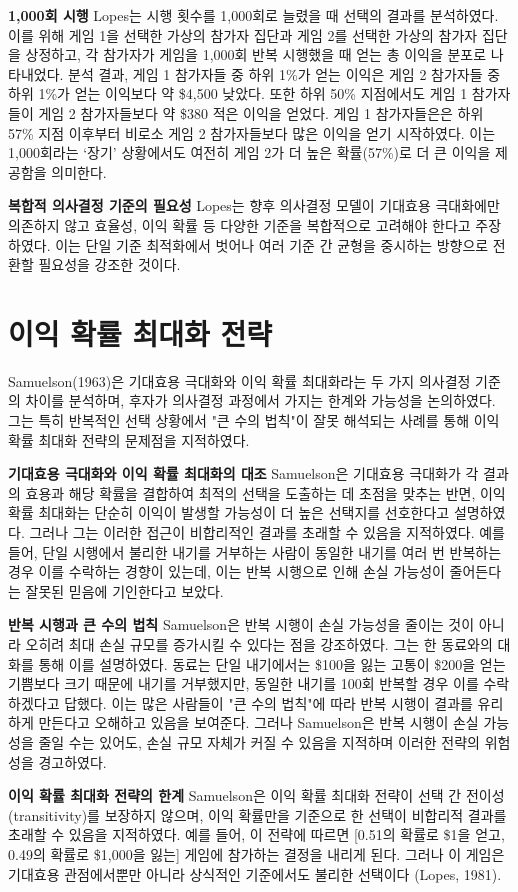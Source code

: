 \textbf{1,000회 시행} Lopes는 시행 횟수를 1,000회로 늘렸을 때 선택의 결과를 분석하였다. 이를 위해 게임 1을 선택한 가상의 참가자 집단과 게임 2를 선택한 가상의 참가자 집단을 상정하고, 각 참가자가 게임을 1,000회 반복 시행했을 때 얻는 총 이익을 분포로 나타내었다. 분석 결과, 게임 1 참가자들 중 하위 1\%가 얻는 이익은 게임 2 참가자들 중 하위 1\%가 얻는 이익보다 약 \$4,500 낮았다. 또한 하위 50\% 지점에서도 게임 1 참가자들이 게임 2 참가자들보다 약 \$380 적은 이익을 얻었다. 게임 1 참가자들은은 하위 57\% 지점 이후부터 비로소 게임 2 참가자들보다 많은 이익을 얻기 시작하였다. 이는 1,000회라는 ‘장기’ 상황에서도 여전히 게임 2가 더 높은 확률(57\%)로 더 큰 이익을 제공함을 의미한다.

\textbf{복합적 의사결정 기준의 필요성} Lopes는 향후 의사결정 모델이 기대효용 극대화에만 의존하지 않고 효율성, 이익 확률 등 다양한 기준을 복합적으로 고려해야 한다고 주장하였다. 이는 단일 기준 최적화에서 벗어나 여러 기준 간 균형을 중시하는 방향으로 전환할 필요성을 강조한 것이다.


\section{이익 확률 최대화 전략}

Samuelson(1963)은 기대효용 극대화와 이익 확률 최대화라는 두 가지 의사결정 기준의 차이를 분석하며, 후자가 의사결정 과정에서 가지는 한계와 가능성을 논의하였다. 그는 특히 반복적인 선택 상황에서 "큰 수의 법칙"이 잘못 해석되는 사례를 통해 이익 확률 최대화 전략의 문제점을 지적하였다.

\textbf{기대효용 극대화와 이익 확률 최대화의 대조} Samuelson은 기대효용 극대화가 각 결과의 효용과 해당 확률을 결합하여 최적의 선택을 도출하는 데 초점을 맞추는 반면, 이익 확률 최대화는 단순히 이익이 발생할 가능성이 더 높은 선택지를 선호한다고 설명하였다. 그러나 그는 이러한 접근이 비합리적인 결과를 초래할 수 있음을 지적하였다. 예를 들어, 단일 시행에서 불리한 내기를 거부하는 사람이 동일한 내기를 여러 번 반복하는 경우 이를 수락하는 경향이 있는데, 이는 반복 시행으로 인해 손실 가능성이 줄어든다는 잘못된 믿음에 기인한다고 보았다.

\textbf{반복 시행과 큰 수의 법칙} Samuelson은 반복 시행이 손실 가능성을 줄이는 것이 아니라 오히려 최대 손실 규모를 증가시킬 수 있다는 점을 강조하였다. 그는 한 동료와의 대화를 통해 이를 설명하였다. 동료는 단일 내기에서는 \$100을 잃는 고통이 \$200을 얻는 기쁨보다 크기 때문에 내기를 거부했지만, 동일한 내기를 100회 반복할 경우 이를 수락하겠다고 답했다. 이는 많은 사람들이 "큰 수의 법칙"에 따라 반복 시행이 결과를 유리하게 만든다고 오해하고 있음을 보여준다. 그러나 Samuelson은 반복 시행이 손실 가능성을 줄일 수는 있어도, 손실 규모 자체가 커질 수 있음을 지적하며 이러한 전략의 위험성을 경고하였다.

\textbf{이익 확률 최대화 전략의 한계} Samuelson은 이익 확률 최대화 전략이 선택 간 전이성(transitivity)를 보장하지 않으며, 이익 확률만을 기준으로 한 선택이 비합리적 결과를 초래할 수 있음을 지적하였다. 예를 들어, 이 전략에 따르면 [0.51의 확률로 \$1을 얻고, 0.49의 확률로 \$1,000을 잃는] 게임에 참가하는 결정을 내리게 된다. 그러나 이 게임은 기대효용 관점에서뿐만 아니라 상식적인 기준에서도 불리한 선택이다 (Lopes, 1981).

